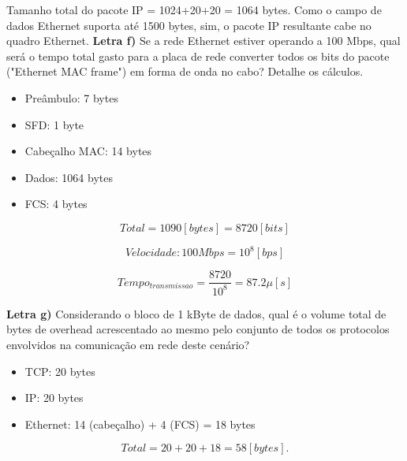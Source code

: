 Tamanho total do pacote IP = 1024+20+20 = 1064 bytes. Como o campo de dados Ethernet suporta até 1500 bytes, sim, o pacote IP resultante cabe no quadro Ethernet.
\newline
\textbf{Letra f)} Se a rede Ethernet estiver operando a 100 Mbps, qual será o tempo total gasto para a placa de rede converter todos os bits do pacote ("Ethernet MAC frame") em forma de onda no cabo? Detalhe os cálculos.
\newline
\begin{itemize}
    \item Preâmbulo: 7 bytes
    \item SFD: 1 byte
    \item Cabeçalho MAC: 14 bytes
    \item Dados: 1064 bytes
    \item FCS: 4 bytes
\end{itemize}

\begin{equation}
Total = 1090 [bytes] = 8720 [bits]
\end{equation}

\begin{equation}
Velocidade: 100 Mbps = 10^8 [bps]
\end{equation}

\begin{equation}
Tempo_{transmissao} = \frac{8720}{10^8} = 87.2 \mu [s]
\end{equation}
\newline


\textbf{Letra g)} Considerando o bloco de 1 kByte de dados, qual é o volume total de bytes de overhead acrescentado ao mesmo pelo conjunto de todos os protocolos envolvidos na comunicação em rede deste cenário?
\newline
\begin{itemize}
    \item TCP: 20 bytes
    \item IP: 20 bytes
    \item Ethernet: 14 (cabeçalho) + 4 (FCS) = 18 bytes
\end{itemize}

\begin{equation}
    Total = 20 + 20 + 18 = 58 [bytes].
\end{equation}
